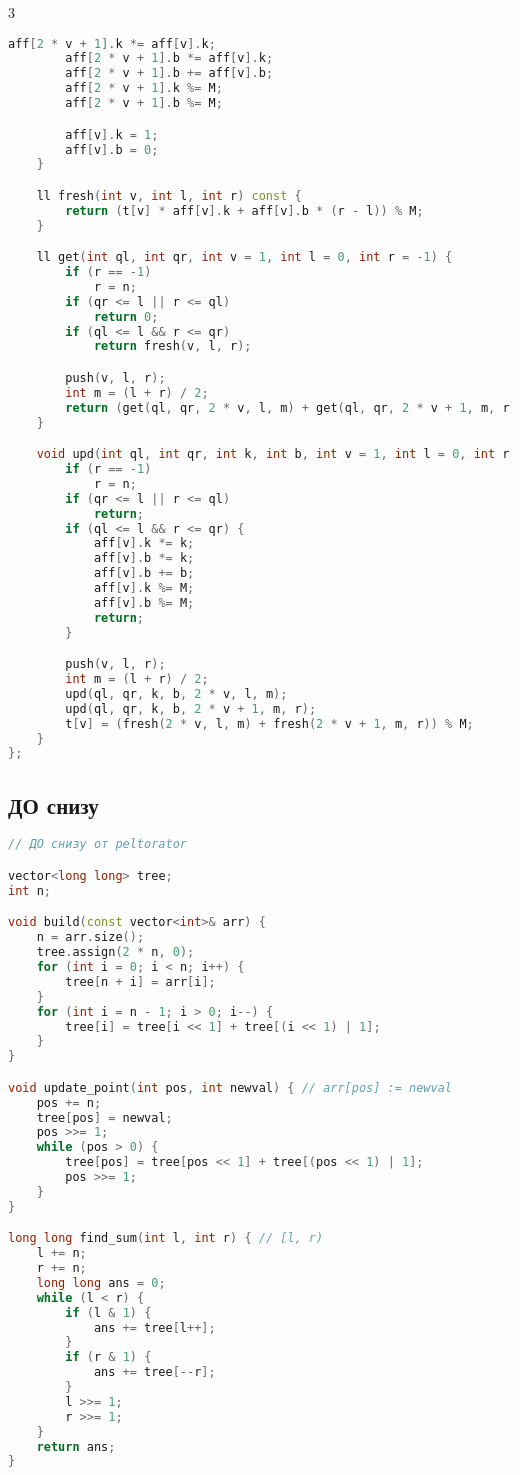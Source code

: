 \documentclass[10pt,a4paper,landscape,twosided]{extarticle}
\begin{document}
\begin{multicols}{3}
\begin{lstlisting}[language=C++]
        aff[2 * v + 1].k *= aff[v].k;
        aff[2 * v + 1].b *= aff[v].k;
        aff[2 * v + 1].b += aff[v].b;
        aff[2 * v + 1].k %= M;
        aff[2 * v + 1].b %= M;

        aff[v].k = 1;
        aff[v].b = 0;
    }

    ll fresh(int v, int l, int r) const {
        return (t[v] * aff[v].k + aff[v].b * (r - l)) % M;
    }

    ll get(int ql, int qr, int v = 1, int l = 0, int r = -1) {
        if (r == -1)
            r = n;
        if (qr <= l || r <= ql)
            return 0;
        if (ql <= l && r <= qr)
            return fresh(v, l, r);

        push(v, l, r);
        int m = (l + r) / 2;
        return (get(ql, qr, 2 * v, l, m) + get(ql, qr, 2 * v + 1, m, r)) % M;
    }

    void upd(int ql, int qr, int k, int b, int v = 1, int l = 0, int r = -1) {
        if (r == -1)
            r = n;
        if (qr <= l || r <= ql)
            return;
        if (ql <= l && r <= qr) {
            aff[v].k *= k;
            aff[v].b *= k;
            aff[v].b += b;
            aff[v].k %= M;
            aff[v].b %= M;
            return;
        }

        push(v, l, r);
        int m = (l + r) / 2;
        upd(ql, qr, k, b, 2 * v, l, m);
        upd(ql, qr, k, b, 2 * v + 1, m, r);
        t[v] = (fresh(2 * v, l, m) + fresh(2 * v + 1, m, r)) % M;
    }
};
\end{lstlisting}

\subsection{ДО снизу}
\begin{lstlisting}[language=C++]
// ДО снизу от peltorator

vector<long long> tree;
int n;

void build(const vector<int>& arr) {
    n = arr.size();
    tree.assign(2 * n, 0);
    for (int i = 0; i < n; i++) {
        tree[n + i] = arr[i];
    }
    for (int i = n - 1; i > 0; i--) {
        tree[i] = tree[i << 1] + tree[(i << 1) | 1];
    }
}

void update_point(int pos, int newval) { // arr[pos] := newval
    pos += n;
    tree[pos] = newval;
    pos >>= 1;
    while (pos > 0) {
        tree[pos] = tree[pos << 1] + tree[(pos << 1) | 1];
        pos >>= 1;
    }
}

long long find_sum(int l, int r) { // [l, r)
    l += n;
    r += n;
    long long ans = 0;
    while (l < r) {
        if (l & 1) {
            ans += tree[l++];
        }
        if (r & 1) {
            ans += tree[--r];
        }
        l >>= 1;
        r >>= 1;
    }
    return ans;
}
\end{lstlisting}


\end{multicols}
\end{document}
